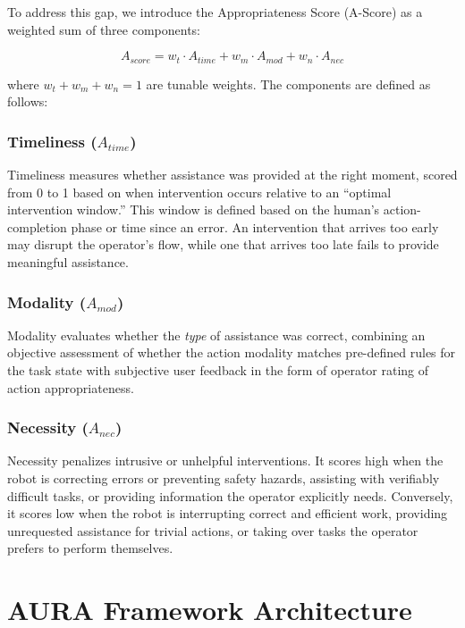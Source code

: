 To address this gap, we introduce the Appropriateness Score (A-Score) as a weighted sum of three components:

\begin{equation}
    A_{score} = w_t \cdot A_{time} + w_m \cdot A_{mod} + w_n \cdot A_{nec}
\end{equation}

where $w_t + w_m + w_n = 1$ are tunable weights. The components are defined as follows:

\subsubsection{Timeliness ($A_{time}$)}

Timeliness measures whether assistance was provided at the right moment, scored from 0 to 1 based on when intervention occurs relative to an ``optimal intervention window.'' This window is defined based on the human's action-completion phase or time since an error. An intervention that arrives too early may disrupt the operator's flow, while one that arrives too late fails to provide meaningful assistance.

\subsubsection{Modality ($A_{mod}$)}

Modality evaluates whether the \emph{type} of assistance was correct, combining an objective assessment of whether the action modality matches pre-defined rules for the task state with subjective user feedback in the form of operator rating of action appropriateness.

\subsubsection{Necessity ($A_{nec}$)}

Necessity penalizes intrusive or unhelpful interventions. It scores high when the robot is correcting errors or preventing safety hazards, assisting with verifiably difficult tasks, or providing information the operator explicitly needs. Conversely, it scores low when the robot is interrupting correct and efficient work, providing unrequested assistance for trivial actions, or taking over tasks the operator prefers to perform themselves.

\section{AURA Framework Architecture}
\label{sec:aura_architecture}

